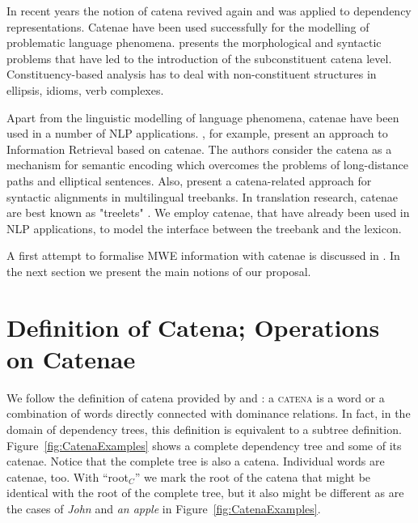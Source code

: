 \documentclass[output=paper]{langsci/langscibook}
\begin{document}
In recent years the notion of catena revived again and was applied to
dependency representations. Catenae have been used successfully for the
modelling of problematic language phenomena. \citet{Gross:2010:PACLIC2010}
presents the morphological and syntactic problems that have led to the
introduction of the subconstituent catena level. Constituency-based analysis
has to deal with non-constituent structures in ellipsis, idioms, verb
complexes.


Apart from the linguistic modelling of language phenomena, catenae have been
used in a number of NLP applications.
\citet{maxwell-oberlander-croft:2013:ACL2013}, for example, present an
approach to Information Retrieval based on catenae. The authors consider the
catena as a mechanism for semantic encoding which overcomes the problems of
long-distance paths and elliptical sentences. Also,
\citet{SANGUINETTI14.674} present a catena-related approach for syntactic
alignments in multilingual treebanks. In translation research, catenae are
best known as "treelets" \citep{journals/mt/QuirkM06}. We employ catenae,
that have already been used in NLP applications, to model the interface between the
treebank and the lexicon.

A first attempt to formalise MWE information with catenae is discussed in
\citet{simov-osenova:2015:Depling}. In the next section we present the main
notions of our proposal.


\section{Definition of Catena; Operations on Catenae}
\label{Catenae}


We follow the definition of catena provided by \cite{OGrady:98} and
\citet{Gross:2010:PACLIC2010}: a \textsc{catena} is a word or a combination of
words directly connected with dominance relations. In fact, in the domain of
dependency trees, this definition is equivalent to a subtree definition.
Figure~\ref{fig:CatenaExamples} shows a complete dependency tree and some of
its catenae. Notice that the complete tree is also a catena. Individual
words are catenae, too. With ``root$_C$'' we mark the root of the catena
that might be identical with the root of the complete tree, but it also
might be different as are the cases of \textit{John} and \textit{an apple} in
Figure~\ref{fig:CatenaExamples}.
\end{document}
